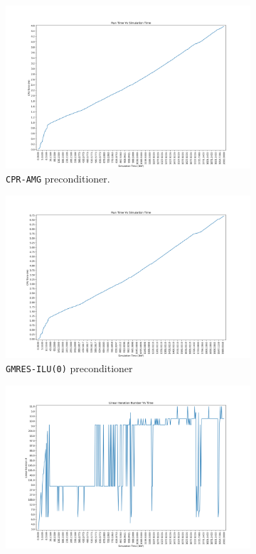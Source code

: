 \begin{figure}
\centering
\begin{subfigure}{.5\textwidth}
  \centering
  \includegraphics[width=1.1\linewidth]{figures/case3/cpr/cpu_time.png_reduced.png}
  \caption{\texttt{CPR-AMG} preconditioner.}
	\label{case3_cpu_cpr}
\end{subfigure}%
\begin{subfigure}{.5\textwidth}
  \centering
  \includegraphics[width=1.1\linewidth]{figures/case3/ilu/cpu_time.png_reduced.png}
  \caption{\texttt{GMRES-ILU(0)} preconditioner}
	\label{case3_cpu_ilu}
\end{subfigure}
\begin{subfigure}{.5\textwidth}
  \centering
  \includegraphics[width=1.1\linewidth]{figures/case3/cpr/its_time.png_reduced.png}

\end{subfigure}
\end{figure}
